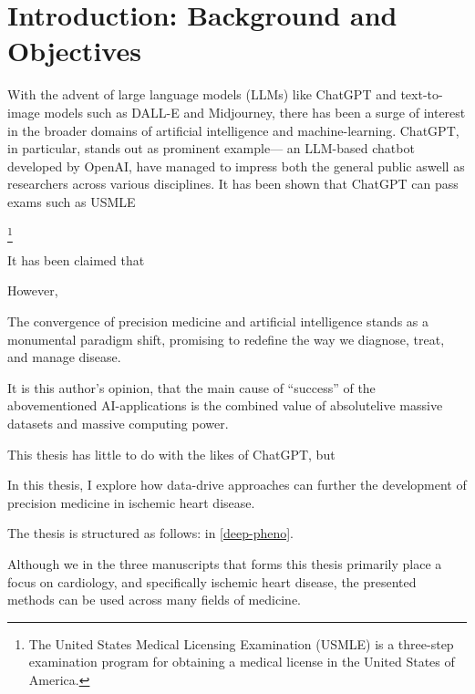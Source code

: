 \chapter{Introduction: Background and Objectives} \label{intro}

With the advent of large language models (LLMs) like ChatGPT
and text-to-image models such as DALL-E and Midjourney,
there has been a surge of interest in the broader domains of
artificial intelligence and machine-learning.
%
ChatGPT, in particular, stands out as prominent example---%
an LLM-based chatbot developed by OpenAI, 
have managed to impress both the general public aswell 
as researchers across various disciplines.
It has been shown that ChatGPT can pass exams
such as USMLE\footnotemark
~\autocite{openaiGPT42023}

\footnote{%
The United States Medical Licensing Examination (USMLE) 
is a three-step examination program for obtaining a medical license
in the United States of America.
}






It has been claimed that 




However, 




The convergence of precision medicine and artificial intelligence 
stands as a monumental paradigm shift, promising to redefine
the way we diagnose, treat, and manage disease.



It is this author's opinion, 
that the main cause of \enquote{success} of the abovementioned
AI-applications is the combined value of 
absolutelive massive datasets and massive computing power.

This thesis has little to do with the likes of ChatGPT, 
but 

In this thesis, I explore how data-drive approaches
can further the development of precision medicine in ischemic heart disease.

The thesis is structured as follows:
in \autoref{deep-pheno}.


Although we in the three manuscripts that forms this thesis 
primarily place a focus on cardiology,
and specifically ischemic heart disease,
the presented methods can be used across many fields of medicine.



